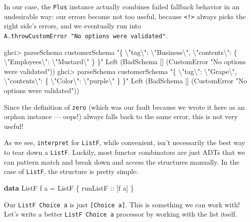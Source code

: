 \documentclass[]{article}
\newenvironment{Shaded}{}{}
\newcommand{\DataTypeTok}[1]{\textcolor[rgb]{0.56,0.13,0.00}{#1}}
\newcommand{\KeywordTok}[1]{\textcolor[rgb]{0.00,0.44,0.13}{\textbf{#1}}}
\newcommand{\NormalTok}[1]{#1}
\newcommand{\OperatorTok}[1]{\textcolor[rgb]{0.40,0.40,0.40}{#1}}
\newcommand{\OtherTok}[1]{\textcolor[rgb]{0.00,0.44,0.13}{#1}}
\newcommand{\StringTok}[1]{\textcolor[rgb]{0.25,0.44,0.63}{#1}}
\begin{document}
In our case, the \texttt{Plus} instance actually combines failed fallback
behavior in an undesirable way: our errors become not too useful, because
\texttt{\textless{}!\textgreater{}} always picks the right side's errors, and we
eventually run into \texttt{A.throwCustomError\ "No\ options\ were\ validated"}.

\begin{Shaded}
\begin{Highlighting}[]
\NormalTok{ghci}\OperatorTok{\textgreater{}}\NormalTok{ parseSchema customerSchema  }\StringTok{"\{ \textbackslash{}"tag\textbackslash{}": \textbackslash{}"Business\textbackslash{}", \textbackslash{}"contents\textbackslash{}": \{ \textbackslash{}"Employees\textbackslash{}": \textbackslash{}"Mustard\textbackslash{}" \} \}"}
\DataTypeTok{Left}\NormalTok{ (}\DataTypeTok{BadSchema}\NormalTok{ [] (}\DataTypeTok{CustomError} \StringTok{"No options were validated"}\NormalTok{))}
\NormalTok{ghci}\OperatorTok{\textgreater{}}\NormalTok{ parseSchema customerSchema  }\StringTok{"\{ \textbackslash{}"tag\textbackslash{}": \textbackslash{}"Grape\textbackslash{}", \textbackslash{}"contents\textbackslash{}": \{ \textbackslash{}"Color\textbackslash{}": \textbackslash{}"purple\textbackslash{}" \} \}"}
\DataTypeTok{Left}\NormalTok{ (}\DataTypeTok{BadSchema}\NormalTok{ [] (}\DataTypeTok{CustomError} \StringTok{"No options were validated"}\NormalTok{))}
\end{Highlighting}
\end{Shaded}

Since the definition of \texttt{zero} (which was our fault because we wrote it
here as an orphan instance --- oops!) always falls back to the same error, this
is not very useful!

As we see, \texttt{interpret} for \texttt{ListF}, while convenient, isn't
necessarily the best way to tear down a \texttt{ListF}. Luckily, most functor
combinators are just ADTs that we can pattern match and break down and access
the structures manually. In the case of \texttt{ListF}, the structure is pretty
simple:

\begin{Shaded}
\begin{Highlighting}[]
\KeywordTok{data} \DataTypeTok{ListF}\NormalTok{ f a }\OtherTok{=} \DataTypeTok{ListF}\NormalTok{ \{}\OtherTok{ runListF ::}\NormalTok{ [f a] \}}
\end{Highlighting}
\end{Shaded}

Our \texttt{ListF\ Choice\ a} is just \texttt{{[}Choice\ a{]}}. This is
something we can work with! Let's write a better \texttt{ListF\ Choice\ a}
processor by working with the list itself.
\end{document}
